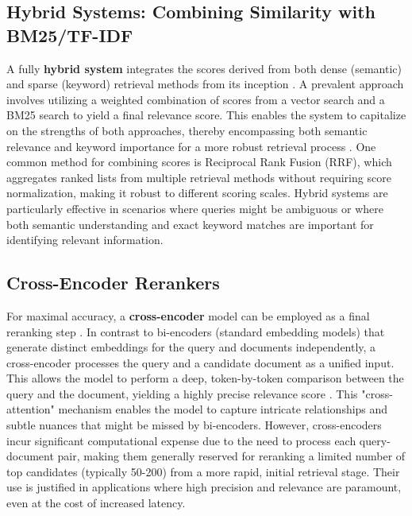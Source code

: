 \subsection{Hybrid Systems: Combining Similarity with BM25/TF-IDF}
A fully \textbf{hybrid system} integrates the scores derived from both dense (semantic) and sparse (keyword) retrieval methods from its inception \autocite{ren2021rocketqa}. A prevalent approach involves utilizing a weighted combination of scores from a vector search and a BM25 search to yield a final relevance score. This enables the system to capitalize on the strengths of both approaches, thereby encompassing both semantic relevance and keyword importance for a more robust retrieval process \autocite{gao2024retrievalaugmented}. One common method for combining scores is Reciprocal Rank Fusion (RRF), which aggregates ranked lists from multiple retrieval methods without requiring score normalization, making it robust to different scoring scales. Hybrid systems are particularly effective in scenarios where queries might be ambiguous or where both semantic understanding and exact keyword matches are important for identifying relevant information.

\subsection{Cross-Encoder Rerankers}
For maximal accuracy, a \textbf{cross-encoder} model can be employed as a final reranking step \autocite{nogueira2019passage}. In contrast to bi-encoders (standard embedding models) that generate distinct embeddings for the query and documents independently, a cross-encoder processes the query and a candidate document as a unified input. This allows the model to perform a deep, token-by-token comparison between the query and the document, yielding a highly precise relevance score \autocite{khattab2020colbert}. This "cross-attention" mechanism enables the model to capture intricate relationships and subtle nuances that might be missed by bi-encoders. However, cross-encoders incur significant computational expense due to the need to process each query-document pair, making them generally reserved for reranking a limited number of top candidates (typically 50-200) from a more rapid, initial retrieval stage. Their use is justified in applications where high precision and relevance are paramount, even at the cost of increased latency.

